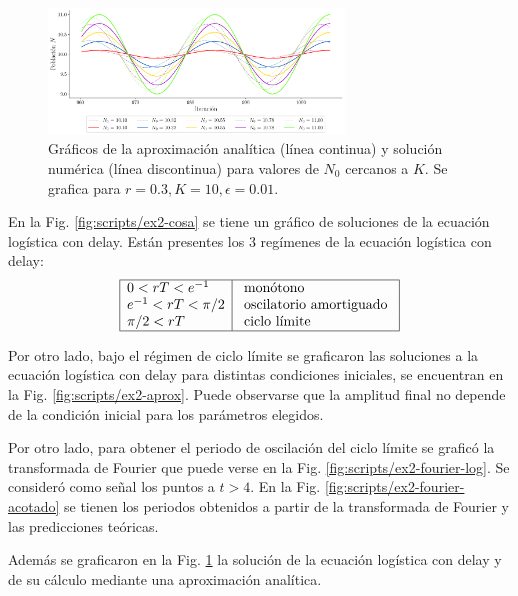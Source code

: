 \documentclass[twocolumn,aps,prl]{revtex4-1}
\begin{document}
\begin{figure}[ht!]
    \centering
        \centering
        \includegraphics[width = 0.7\textwidth]{scripts/ex2-cosaPrueba.pdf}
        \caption{Gráficos de la aproximación analítica (línea continua) y solución numérica (línea discontinua) para valores de $N_0$ cercanos a $K$. Se grafica para $r = 0.3, K=10, \epsilon = 0.01$.}
        \label{fig:scripts/ex2-cosaPrueba}
\end{figure}

En la Fig. \ref{fig:scripts/ex2-cosa} se tiene un gráfico de soluciones de la ecuación logística con delay. Están presentes los 3 regímenes de la ecuación logística con delay:
$$
\begin{array}{|l|l|}
\hline 0<r T <e^{-1} & \text { monótono } \\
e^{-1}<r T <\pi / 2 & \text { oscilatorio amortiguado } \\
\pi / 2<r T  & \text { ciclo límite } \\
\hline
\end{array}
$$

Por otro lado, bajo el régimen de ciclo límite se graficaron las soluciones a la ecuación logística con delay para distintas condiciones iniciales, se encuentran en la Fig. \ref{fig:scripts/ex2-aprox}. Puede observarse que la amplitud final no depende de la condición inicial para los parámetros elegidos.

Por otro lado, para obtener el periodo de oscilación del ciclo límite se graficó la transformada de Fourier que puede verse en la Fig. \ref{fig:scripts/ex2-fourier-log}. Se consideró como señal los puntos a $t>4$. En la Fig. \ref{fig:scripts/ex2-fourier-acotado} se tienen los periodos obtenidos a partir de la transformada de Fourier y las predicciones teóricas.

Además se graficaron en la Fig. \ref{fig:scripts/ex2-cosaPrueba} la solución de la ecuación logística con delay y de su cálculo mediante una aproximación analítica.
\end{document}
